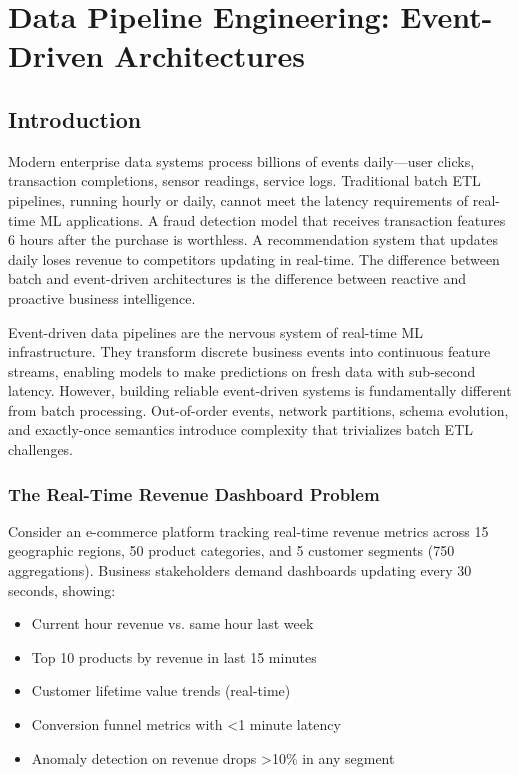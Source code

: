 \chapter{Data Pipeline Engineering: Event-Driven Architectures}

\section{Introduction}

Modern enterprise data systems process billions of events daily---user clicks, transaction completions, sensor readings, service logs. Traditional batch ETL pipelines, running hourly or daily, cannot meet the latency requirements of real-time ML applications. A fraud detection model that receives transaction features 6 hours after the purchase is worthless. A recommendation system that updates daily loses revenue to competitors updating in real-time. The difference between batch and event-driven architectures is the difference between reactive and proactive business intelligence.

Event-driven data pipelines are the nervous system of real-time ML infrastructure. They transform discrete business events into continuous feature streams, enabling models to make predictions on fresh data with sub-second latency. However, building reliable event-driven systems is fundamentally different from batch processing. Out-of-order events, network partitions, schema evolution, and exactly-once semantics introduce complexity that trivializes batch ETL challenges.

\subsection{The Real-Time Revenue Dashboard Problem}

Consider an e-commerce platform tracking real-time revenue metrics across 15 geographic regions, 50 product categories, and 5 customer segments (750 aggregations). Business stakeholders demand dashboards updating every 30 seconds, showing:

\begin{itemize}
    \item Current hour revenue vs. same hour last week
    \item Top 10 products by revenue in last 15 minutes
    \item Customer lifetime value trends (real-time)
    \item Conversion funnel metrics with <1 minute latency
    \item Anomaly detection on revenue drops >10\% in any segment
\end{itemize}

